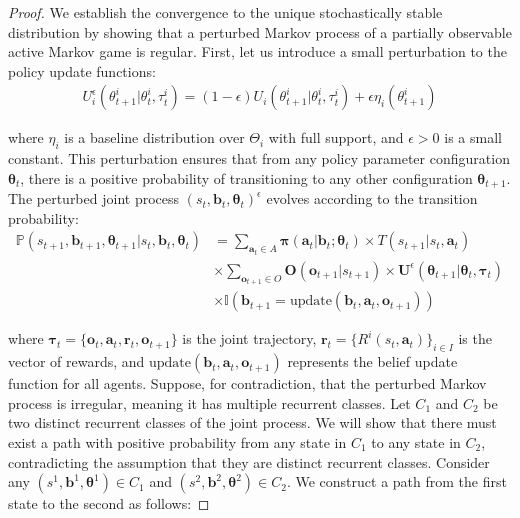 \documentclass[a4paper,12pt]{report}
\begin{document}
\begin{proof}
    We establish the convergence to the unique stochastically stable distribution by
    showing that a perturbed Markov process of a partially observable active Markov
    game is regular. First, let us introduce a small perturbation to the policy update
    functions:
    \begin{align}
        U^{\epsilon}_{i}(\theta^{i}_{t+1}|\theta^{i}_{t}, \tau^{i}_{t}) = (1 - \epsilon) U_{i}(\theta^{i}_{t+1}|\theta^{i}_{t}, \tau^{i}_{t}) + \epsilon \eta_{i}(\theta^{i}_{t+1})
    \end{align}

    where $\eta_{i}$ is a baseline distribution over $\Theta_{i}$ with full support,
    and $\epsilon > 0$ is a small constant. This perturbation ensures that from any
    policy parameter configuration $\boldsymbol{\theta}_{t}$, there is a positive
    probability of transitioning to any other configuration
    $\boldsymbol{\theta}_{t+1}$. The perturbed joint process $(s_{t}, \boldsymbol{b}
        _{t}, \boldsymbol{\theta}_{t})^{\epsilon}$ evolves according to the transition
    probability:
    \begin{align}
        \mathbb{P}(s_{t+1}, \boldsymbol{b}_{t+1}, \boldsymbol{\theta}_{t+1}|s_{t}, \boldsymbol{b}_{t}, \boldsymbol{\theta}_{t}) & = \sum_{\boldsymbol{a}_t \in A}\boldsymbol{\pi}(\boldsymbol{a}_{t}|\boldsymbol{b}_{t}; \boldsymbol{\theta}_{t}) \times T(s_{t+1}|s_{t}, \boldsymbol{a}_{t})                                     \\
                                                                                                                                & \times \sum_{\boldsymbol{o}_{t+1} \in O}\boldsymbol{O}(\boldsymbol{o}_{t+1}|s_{t+1}) \times \boldsymbol{U}^{\epsilon}(\boldsymbol{\theta}_{t+1}|\boldsymbol{\theta}_{t}, \boldsymbol{\tau}_{t}) \\
                                                                                                                                & \times \mathbb{I}(\boldsymbol{b}_{t+1}= \text{update}(\boldsymbol{b}_{t}, \boldsymbol{a}_{t}, \boldsymbol{o}_{t+1}))
    \end{align}

    where $\boldsymbol{\tau}_{t} = \{\boldsymbol{o}_{t}, \boldsymbol{a}_{t}, \boldsymbol
        {r}_{t}, \boldsymbol{o}_{t+1}\}$ is the joint trajectory,
    $\boldsymbol{r}_{t} = \{R^{i}(s_{t}, \boldsymbol{a}_{t})\}_{i \in I}$ is the
    vector of rewards, and $\text{update}(\boldsymbol{b}_{t}, \boldsymbol{a}_{t}, \boldsymbol
        {o}_{t+1})$ represents the belief update function for all agents. Suppose, for
    contradiction, that the perturbed Markov process is irregular, meaning it has multiple
    recurrent classes. Let $C_{1}$ and $C_{2}$ be two distinct recurrent classes
    of the joint process. We will show that there must exist a path with positive probability
    from any state in $C_{1}$ to any state in $C_{2}$, contradicting the
    assumption that they are distinct recurrent classes. Consider any $(s^{1}, \boldsymbol
        {b}^{1}, \boldsymbol{\theta}^{1}) \in C_{1}$ and $(s^{2}, \boldsymbol{b}^{2}, \boldsymbol
        {\theta}^{2}) \in C_{2}$. We construct a path from the first state to the
    second as follows:


\end{proof}
\end{document}
